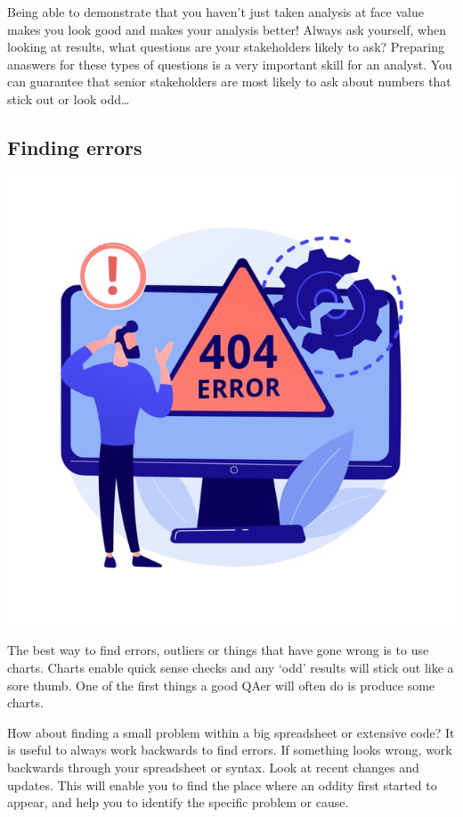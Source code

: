 \documentclass[
]{article}
\begin{document}
Being able to demonstrate that you haven't just taken analysis at face value makes you look good and makes your analysis better! Always ask yourself, when looking at results, what questions are your stakeholders likely to ask? Preparing anaswers for these types of questions is a very important skill for an analyst. You can guarantee that senior stakeholders are most likely to ask about numbers that stick out or look odd\ldots{}

\hypertarget{finding-errors}{%
\subsection{Finding errors}\label{finding-errors}}

\includegraphics{pictures/error_pic.jpg}

The best way to find errors, outliers or things that have gone wrong is to use charts. Charts enable quick sense checks and any `odd' results will stick out like a sore thumb. One of the first things a good QAer will often do is produce some charts.

How about finding a small problem within a big spreadsheet or extensive code? It is useful to always work backwards to find errors. If something looks wrong, work backwards through your spreadsheet or syntax. Look at recent changes and updates. This will enable you to find the place where an oddity first started to appear, and help you to identify the specific problem or cause.
\end{document}
